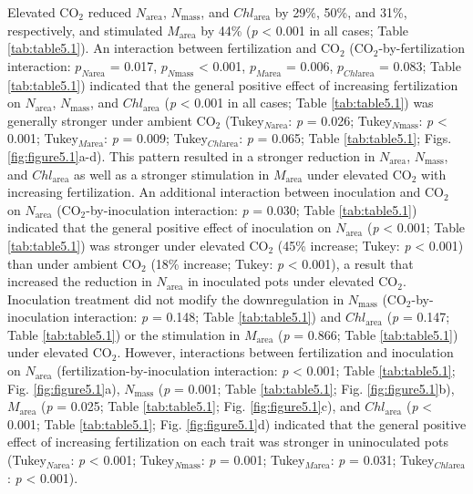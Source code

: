 Elevated CO$_2$ reduced $N_\mathrm{area}$, $N_\mathrm{mass}$, and $Chl_\mathrm{area}$ by 29\%, 50\%, and 31\%, respectively, and stimulated $M_\mathrm{area}$ by 44\% (\textit{p} < 0.001 in all cases; Table \ref{tab:table5.1}). An interaction between fertilization and CO$_2$ (CO$_2$-by-fertilization interaction: $p_{N\mathrm{area}}$ = 0.017, $p_{N\mathrm{mass}}$ < 0.001, $p_{M\mathrm{area}}$ = 0.006, $p_{Chl\mathrm{area}}$ = 0.083; Table \ref{tab:table5.1}) indicated that the general positive effect of increasing fertilization on $N_\mathrm{area}$, $N_\mathrm{mass}$, and $Chl_\mathrm{area}$ (\textit{p} < 0.001 in all cases; Table \ref{tab:table5.1}) was generally stronger under ambient CO$_2$ (Tukey$_{N\mathrm{area}}$: \textit{p} = 0.026; Tukey$_{N\mathrm{mass}}$: \textit{p} < 0.001; Tukey$_{M\mathrm{area}}$: \textit{p} = 0.009; Tukey$_{Chl\mathrm{area}}$: \textit{p} = 0.065; Table \ref{tab:table5.1}; Figs. \ref{fig:figure5.1}a-d). This pattern resulted in a stronger reduction in $N_\mathrm{area}$, $N_\mathrm{mass}$, and $Chl_\mathrm{area}$  as well as a stronger stimulation in $M_\mathrm{area}$ under elevated CO$_2$ with increasing fertilization. An additional interaction between inoculation and CO$_2$ on $N_\mathrm{area}$ (CO$_2$-by-inoculation interaction: \textit{p} = 0.030; Table \ref{tab:table5.1}) indicated that the general positive effect of inoculation on $N_\mathrm{area}$ (\textit{p} < 0.001; Table \ref{tab:table5.1}) was stronger under elevated CO$_2$ (45\% increase; Tukey: \textit{p} < 0.001) than under ambient CO$_2$ (18\% increase; Tukey: \textit{p} < 0.001), a result that increased the reduction in $N_\mathrm{area}$ in inoculated pots under elevated CO$_2$. Inoculation treatment did not modify the downregulation in $N_\mathrm{mass}$ (CO$_2$-by-inoculation interaction: \textit{p} = 0.148; Table \ref{tab:table5.1}) and $Chl_\mathrm{area}$ (\textit{p} = 0.147; Table \ref{tab:table5.1}) or the stimulation in $M_\mathrm{area}$ (\textit{p} = 0.866; Table \ref{tab:table5.1}) under elevated CO$_2$. However, interactions between fertilization and inoculation on $N_\mathrm{area}$ (fertilization-by-inoculation interaction: \textit{p} < 0.001; Table \ref{tab:table5.1}; Fig. \ref{fig:figure5.1}a), $N_\mathrm{mass}$ (\textit{p} = 0.001; Table \ref{tab:table5.1}; Fig. \ref{fig:figure5.1}b), $M_\mathrm{area}$ (\textit{p} = 0.025; Table \ref{tab:table5.1}; Fig. \ref{fig:figure5.1}c), and $Chl_\mathrm{area}$ (\textit{p} < 0.001; Table \ref{tab:table5.1}; Fig. \ref{fig:figure5.1}d) indicated that the general positive effect of increasing fertilization on each trait was stronger in uninoculated pots (Tukey$_{N\mathrm{area}}$: \textit{p} < 0.001; Tukey$_{N\mathrm{mass}}$: \textit{p} = 0.001; Tukey$_{M\mathrm{area}}$: \textit{p} = 0.031; Tukey$_{Chl\mathrm{area}}$: \textit{p} < 0.001).


